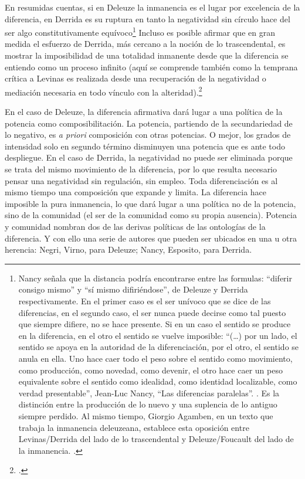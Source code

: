En resumidas cuentas, si en Deleuze la inmanencia es el lugar por excelencia de la diferencia, en Derrida es su ruptura en tanto la negatividad sin círculo hace del ser algo constitutivamente equívoco\footnote{Nancy señala que la distancia podría encontrarse entre las formulas: \enquote{diferir consigo mismo} y \enquote{sí mismo difiriéndose}, de Deleuze y Derrida respectivamente. En el primer caso es el ser unívoco que se dice de las diferencias, en el segundo caso, el ser nunca puede decirse como tal puesto que siempre difiere, no se hace presente. Si en un caso el sentido se produce en la diferencia, en el otro el sentido se vuelve imposible: \enquote{(\ldots) por un lado, el sentido se apoya en la autoridad de la diferenciación, por el otro, el sentido se anula en ella. Uno hace caer todo el peso sobre el sentido como movimiento, como producción, como novedad, como devenir, el otro hace caer un peso equivalente sobre el sentido como idealidad, como identidad localizable, como verdad presentable}, Jean-Luc Nancy, \enquote{Las diferencias paralelas}. \cite[256]{@6989-NANCY2008}. Es la distinción entre la producción de lo nuevo y una suplencia de lo antiguo siempre perdido. Al mismo tiempo, Giorgio Agamben, en un texto que trabaja la inmanencia deleuzeana, establece esta oposición entre Levinas/Derrida del lado de lo trascendental y Deleuze/Foucault del lado de la inmanencia. \cite{@6990-AGAMBEN2008}.} Incluso es posible afirmar que en gran medida el esfuerzo de Derrida, más cercano a la noción de lo trascendental, es mostrar la imposibilidad de una totalidad inmanente desde que la diferencia se entiendo como un proceso infinito (aquí se comprende también como la temprana crítica a Levinas es realizada desde una recuperación de la negatividad o mediación necesaria en todo vínculo con la alteridad).\footcite{@6994-DERRIDA1989}

En el caso de Deleuze, la diferencia afirmativa dará lugar a una política de la potencia como composibilitación. La potencia, partiendo de la secundariedad de lo negativo, es \emph{a priori} composición con otras potencias. O mejor, los grados de intensidad solo en segundo término disminuyen una potencia que es ante todo despliegue. En el caso de Derrida, la negatividad no puede ser eliminada porque se trata del mismo movimiento de la diferencia, por lo que resulta necesario pensar una negatividad sin regulación, sin empleo. Toda diferenciación es al mismo tiempo una composición que expande y limita. La diferencia hace imposible la pura inmanencia, lo que dará lugar a una política no de la potencia, sino de la comunidad (el ser de la comunidad como su propia ausencia). Potencia y comunidad nombran dos de las derivas políticas de las ontologías de la diferencia. Y con ello una serie de autores que pueden ser ubicados en una u otra herencia: Negri, Virno, para Deleuze; Nancy, Esposito, para Derrida.

